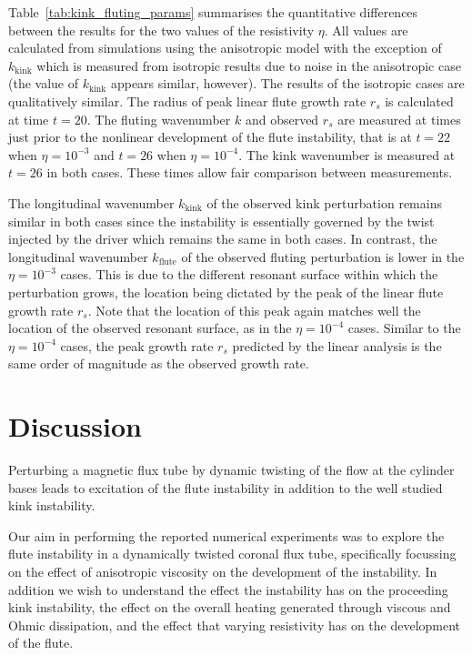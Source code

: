 \documentclass[fleqn,usenatbib]{mnras}
\newcommand{\rev}[1]{{\color{red} {#1}}}
\begin{document}
Table~\ref{tab:kink_fluting_params} summarises the quantitative differences
between the results for the two values of the resistivity $\eta$. All values
are calculated from simulations using the anisotropic model with the exception
of $k_{\text{kink}}$ which is measured from isotropic results due to noise in
the anisotropic case (the value of $k_{\text{kink}}$ appears similar, however).
The results of the isotropic cases are qualitatively similar. The radius of
peak \rev{linear flute growth rate $r_s$} is calculated at time $t=20$. The fluting wavenumber $k$ and
observed $r_s$ are measured at times just prior to the nonlinear development of
the flute instability, that is at $t=22$ when $\eta=10^{-3}$ and $t=26$ when
$\eta = 10^{-4}$. The kink wavenumber is measured at $t=26$ in both cases.
These times allow fair comparison between measurements.

The longitudinal wavenumber $k_{\text{kink}}$ of the observed kink perturbation
remains similar in both cases since the instability is essentially governed by
the twist injected by the driver which remains the same in both cases. In
contrast, the longitudinal wavenumber $k_{\text{flute}}$ of the observed
fluting perturbation is lower in the $\eta=10^{-3}$ cases. This is due to the
different resonant surface within which the perturbation grows, the location
being dictated by the peak of the linear \rev{flute growth rate $r_s$}. Note that the location of
this peak again matches well the location of the observed resonant surface, as
in the $\eta=10^{-4}$ cases. Similar to the $\eta=10^{-4}$ cases, the \rev{peak
growth rate $r_s$} predicted by the linear analysis is the same order of magnitude as
the observed growth rate.

\section{Discussion}
\label{sec-discussion}

\rev{Perturbing a magnetic flux tube by dynamic twisting of the flow
at the cylinder bases leads to excitation of the flute instability in
addition to the well studied kink instability.}

\rev{Our aim in performing the reported numerical experiments was to explore
the flute instability in a dynamically twisted coronal flux tube, specifically
focussing on the effect of anisotropic viscosity on the development of the
instability. In addition we wish to understand the effect the instability has
on the proceeding kink instability, the effect on the overall heating generated
through viscous and Ohmic dissipation, and the effect that varying resistivity
has on the development of the flute.}
\end{document}
